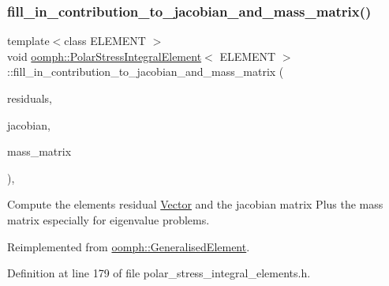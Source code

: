 \subsubsection{\texorpdfstring{fill\+\_\+in\+\_\+contribution\+\_\+to\+\_\+jacobian\+\_\+and\+\_\+mass\+\_\+matrix()}{fill\_in\_contribution\_to\_jacobian\_and\_mass\_matrix()}}
{\footnotesize\ttfamily template$<$class E\+L\+E\+M\+E\+NT $>$ \\
void \hyperlink{classoomph_1_1PolarStressIntegralElement}{oomph\+::\+Polar\+Stress\+Integral\+Element}$<$ E\+L\+E\+M\+E\+NT $>$\+::fill\+\_\+in\+\_\+contribution\+\_\+to\+\_\+jacobian\+\_\+and\+\_\+mass\+\_\+matrix (\begin{DoxyParamCaption}\item[{\hyperlink{classoomph_1_1Vector}{Vector}$<$ double $>$ \&}]{residuals,  }\item[{\hyperlink{classoomph_1_1DenseMatrix}{Dense\+Matrix}$<$ double $>$ \&}]{jacobian,  }\item[{\hyperlink{classoomph_1_1DenseMatrix}{Dense\+Matrix}$<$ double $>$ \&}]{mass\+\_\+matrix }\end{DoxyParamCaption})\hspace{0.3cm}{\ttfamily [inline]}, {\ttfamily [virtual]}}



Compute the element\textquotesingle{}s residual \hyperlink{classoomph_1_1Vector}{Vector} and the jacobian matrix Plus the mass matrix especially for eigenvalue problems. 



Reimplemented from \hyperlink{classoomph_1_1GeneralisedElement_a2b6294a730647cf865da94f2531466f8}{oomph\+::\+Generalised\+Element}.



Definition at line 179 of file polar\+\_\+stress\+\_\+integral\+\_\+elements.\+h.

\mbox{\label{classoomph_1_1PolarStressIntegralElement_a15e709f5a2763bbc865f9c3060aebca0}} 
